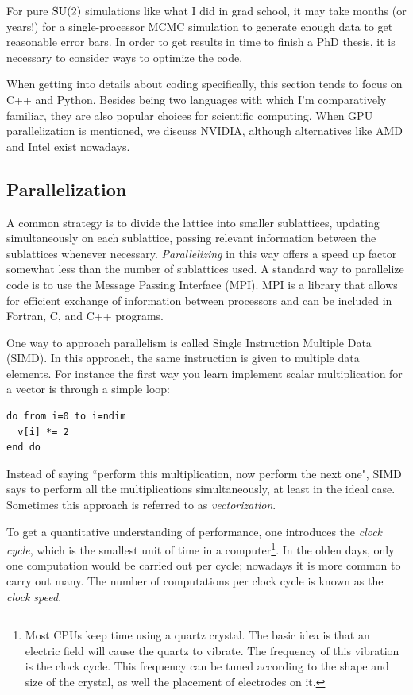 For pure $\operatorname{SU}(2)$ simulations like what I did in grad school, 
it may take months (or years!) for a single-processor MCMC simulation to
generate enough data to get reasonable error bars. In order to get
results in time to finish a PhD thesis, it is necessary to consider ways to
optimize the code.

When getting into details about coding specifically, this section tends to focus
on C++ and Python. Besides being two languages with which I'm comparatively
familiar, they are also popular choices for scientific computing. When GPU
parallelization is mentioned, we discuss NVIDIA, although alternatives like AMD
and Intel exist nowadays.

\subsection{Parallelization}

A common strategy is to divide the lattice into smaller sublattices, updating
simultaneously on each sublattice, passing relevant information between the
sublattices whenever necessary. {\it Parallelizing} 
in this way offers a speed
up factor somewhat less than the number of sublattices used. A standard way to
parallelize code is to use the Message Passing Interface (MPI). MPI 
is a library that allows for efficient exchange of information between processors 
and can be included in Fortran, C, and C++ programs.

One way to approach parallelism is called Single Instruction Multiple
Data (SIMD). In this approach, the same instruction is given to
multiple data elements. For instance the first way you learn implement scalar
multiplication for a vector is through a simple loop:
\begin{verbatim}
do from i=0 to i=ndim
  v[i] *= 2
end do
\end{verbatim}
Instead of saying ``perform this multiplication, now perform the next one", SIMD
says to perform all the multiplications simultaneously, at least in the ideal
case. Sometimes this approach is referred to as {\it
vectorization}.

To get a quantitative understanding of performance, one introduces
the {\it clock cycle}, which is the smallest unit of
time in a computer\footnote{Most CPUs keep time using a quartz crystal.
The basic idea is that an electric field will cause the quartz to
vibrate. The frequency of this vibration is the clock cycle.
This frequency can be tuned according to the shape and size of the
crystal, as well the placement of electrodes on it.}.
In the olden days, only one computation would be carried out per cycle;
nowadays it is more common to carry out many. The number of
computations per clock cycle is known as the {\it clock speed}.

